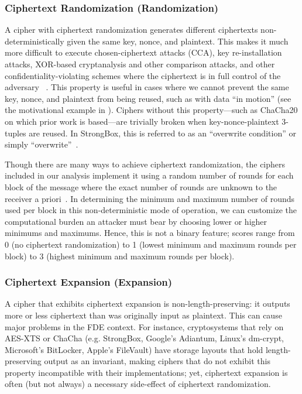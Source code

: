 \subsubsection{Ciphertext Randomization (Randomization)}

A cipher with ciphertext randomization generates different ciphertexts
non-deterministically given the same key, nonce, and plaintext. This makes it
much more difficult to execute chosen-ciphertext attacks (CCA), key
re-installation attacks, XOR-based cryptanalysis and other comparison attacks,
and other confidentiality-violating schemes where the ciphertext is in full
control of the adversary ~\cite{Freestyle}. This property is useful in cases
where we cannot prevent the same key, nonce, and plaintext from being
reused, such as with data ``in motion'' (see the motivational example in
). Ciphers without this property---such as ChaCha20 on which
prior work is based---are trivially broken when key-nonce-plaintext 3-tuples are
reused. In StrongBox, this is referred to as an ``overwrite condition'' or
simply ``overwrite''~\cite{StrongBox}.

Though there are many ways to achieve ciphertext randomization, the ciphers
included in our analysis implement it using a random number of rounds for each
block of the message where the exact number of rounds are unknown to the
receiver a priori~\cite{Freestyle}. In determining the minimum and maximum
number of rounds used per block in this non-deterministic mode of operation, we
can customize the computational burden an attacker must bear by choosing lower
or higher minimums and maximums. Hence, this is not a binary feature; scores
range from 0 (no ciphertext randomization) to 1 (lowest minimum and maximum
rounds per block) to 3 (highest minimum and maximum rounds per block).

\subsubsection{Ciphertext Expansion (Expansion)}

A cipher that exhibits ciphertext expansion is non-length-preserving: it outputs
more or less ciphertext than was originally input as plaintext. This can cause
major problems in the FDE context. For instance, cryptosystems that rely on
AES-XTS or ChaCha (e.g. StrongBox, Google's Adiantum, Linux's dm-crypt,
Microsoft's BitLocker, Apple's FileVault) have storage layouts that hold
length-preserving output as an invariant, making ciphers that do not exhibit
this property incompatible with their implementations; yet, ciphertext expansion
is often (but not always) a necessary side-effect of ciphertext randomization. 

